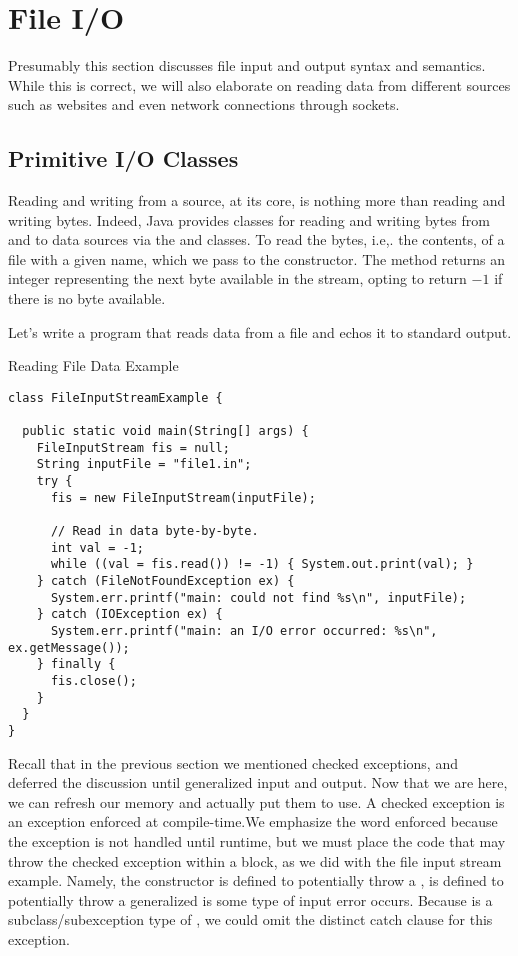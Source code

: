 \section{File I/O}

Presumably this section discusses file input and output syntax and semantics. While this is correct, we will also elaborate on reading data from different sources such as websites and even network connections through sockets. 

\subsection*{Primitive I/O Classes}

Reading and writing from a source, at its core, is nothing more than reading and writing bytes. Indeed, Java provides classes for reading and writing bytes from and to data sources via the  and  classes. To read the bytes, i.e,. the contents, of a file with a given name, which we pass to the  constructor. The  method returns an integer representing the next byte available in the stream, opting to return $-1$ if there is no byte available. 

\example Let's write a program that reads data from a file and echos it to standard output.

\begin{cl}{Reading File Data Example}
\begin{lstlisting}[language=MyJava]
class FileInputStreamExample {

  public static void main(String[] args) {
    FileInputStream fis = null;
    String inputFile = "file1.in";
    try {
      fis = new FileInputStream(inputFile);
      
      // Read in data byte-by-byte.
      int val = -1;
      while ((val = fis.read()) != -1) { System.out.print(val); }
    } catch (FileNotFoundException ex) {
      System.err.printf("main: could not find %s\n", inputFile);
    } catch (IOException ex) {
      System.err.printf("main: an I/O error occurred: %s\n", ex.getMessage());
    } finally {
      fis.close();
    } 
  } 
}
\end{lstlisting}
\end{cl}

Recall that in the previous section we mentioned checked exceptions, and deferred the discussion until generalized input and output. Now that we are here, we can refresh our memory and actually put them to use. A checked exception is an exception enforced at compile-time.We emphasize the word enforced because the exception is not handled until runtime, but we must place the code that may throw the checked exception within a  block, as we did with the file input stream example. Namely, the  constructor is defined to potentially throw a ,  is defined to potentially throw a generalized  is some type of input error occurs. Because  is a subclass/subexception type of , we could omit the distinct catch clause for this exception. 

